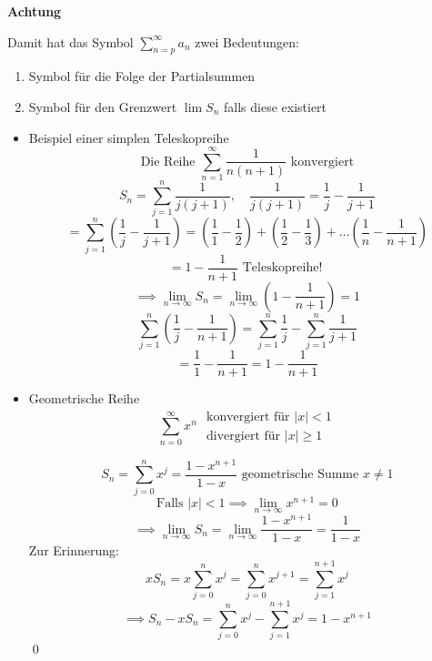 \documentclass[fleqn]{scrbook}
\renewenvironment{proof}{{\bfseries Beweis }}{\qed}
\newenvironment{example}{{\bfseries Beispiel }}{}
\begin{document}
\textbf{Achtung}

Damit hat das Symbol $\sum_{n=p}^\infty a_n$ zwei Bedeutungen:

\begin{enumerate}
  \item Symbol für die Folge der Partialsummen
  \item Symbol für den Grenzwert $\lim S_n$ falls diese existiert
\end{enumerate}

\begin{example}

  \begin{itemize}
    \item Beispiel einer simplen Teleskopreihe
      \[\text{Die Reihe } \sum_{n=1}^\infty \frac{1}{n(n+1)} \text{ konvergiert}\]
      \[S_n = \sum_{j=1}^n \frac{1}{j(j+1)}, \quad \frac{1}{j(j+1)} = \frac{1}{j}-\frac{1}{j+1}\]
      \[= \sum_{j=1}^n \left( \frac{1}{j}-\frac{1}{j+1} \right) = \left( \frac{1}{1}-\frac{1}{2} \right) + \left( \frac{1}{2}-\frac{1}{3} \right) + \ldots \left( \frac{1}{n}-\frac{1}{n+1} \right) \]   
      \[= 1 - \frac{1}{n+1} \text{ Teleskopreihe! }\]
      \[\implies \lim_{n \to \infty} S_n = \lim_{n\to \infty} \left(1- \frac{1}{n+1} \right) =1\]
      \[\sum_{j=1}^n \left( \frac{1}{j} - \frac{1}{n+1} \right)  = \sum_{j=1}^n \frac{1}{j} - \sum_{j=1}^n \frac{1}{j+1}\]
      \[= \frac{1}{1} - \frac{1}{n+1} = 1-\frac{1}{n+1}\]
    \item Geometrische Reihe 
     \[ \sum_{n=0}^\infty x^n
       \begin{array}{l}
         \text{ konvergiert für } |x| < 1 \\
         \text{ divergiert für } |x| \geq 1   
       \end{array}       
     \]
     
     \begin{proof}
       \[S_n = \sum_{j=0}^n x^j = \frac{1-x^{n+1}}{1-x} \text{ geometrische Summe } x \neq 1\]
       \[\text{Falls } |x|<1 \implies \lim_{n\to \infty} x^{n+1} = 0 \]
       \[\implies \lim_{n \to \infty} S_n = \lim_{n \to \infty} \frac{1-x^{n+1}}{1-x}=\frac{1}{1-x}\]
       Zur Erinnerung:
       \[x S_n = x \sum_{j=0}^n x^j = \sum_{j=0}^n x^{j+1} = \sum_{j=1}^{n+1} x^{j}\]
       \[\implies S_n-x S_n = \sum_{j=0}^n x^j - \sum_{j=1}^{n+1} x^{j} = 1 - x^{n+1}\]
     \end{proof}
  \end{itemize}

\end{example}
\end{document}
